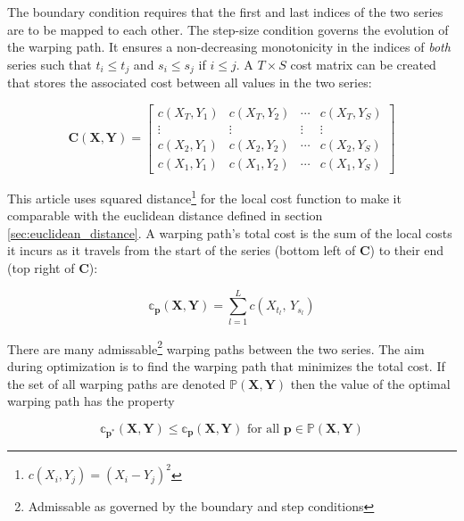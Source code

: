 \documentclass[12pt]{article}
\begin{document}
The boundary condition requires that the first and last indices of the two series are to be mapped to each other. The step-size condition governs the evolution of the warping path. It ensures a non-decreasing monotonicity in the indices of \emph{both} series such that $t_{i} \le t_{j}$ and $s_{i} \le s_{j}$ if $i \le j$. A $T \times S$ cost matrix can be created that stores the associated cost between all values in the two series:

\begin{equation}
    \mathbf{C}(\boldsymbol{X}, \boldsymbol{Y}) = \left[ 
        \begin{array}{cccc}
            c(X_{T}, Y_{1}) & c(X_{T}, Y_{2}) & \cdots & c(X_{T}, Y_{S}) \\ 
            \vdots          & \vdots          & \vdots & \vdots          \\
            c(X_{2}, Y_{1}) & c(X_{2}, Y_{2}) & \cdots & c(X_{2}, Y_{S}) \\ 
            c(X_{1}, Y_{1}) & c(X_{1}, Y_{2}) & \cdots & c(X_{1}, Y_{S})
    \end{array}\right]
\end{equation}

This article uses squared distance\footnote{$c(X_{i}, Y_{j}) = (X_{i} - Y_{j})^2$} for the local cost function to make it comparable with the euclidean distance defined in section \ref{sec:euclidean_distance}. A warping path's total cost is the sum of the local costs it incurs as it travels from the start of the series (bottom left of $\boldsymbol{C}$) to their end (top right of $\boldsymbol{C}$):

\begin{equation} \label{eq:dtw_cost_matrix_definition}
    \mathbb{c}_{\boldsymbol{p}}(\boldsymbol{X}, \boldsymbol{Y}) = \sum^{L}_{l=1} c(X_{t_{l}},\, Y_{s_{l}})
\end{equation}

There are many admissable\footnote{Admissable as governed by the boundary and step conditions} warping paths between the two series. The aim during optimization is to find the warping path that minimizes the total cost. If the set of all warping paths are denoted $\mathbb{P}(\boldsymbol{X}, \boldsymbol{Y})$ then the value of the optimal warping path has the property

\begin{equation}
    \mathbb{c}_{\boldsymbol{p}^{*}}(\boldsymbol{X}, \boldsymbol{Y}) \le \mathbb{c}_{\boldsymbol{p}}(\boldsymbol{X}, \boldsymbol{Y}) \,\, \textrm{for all} \,\, \boldsymbol{p} \in \mathbb{P}(\boldsymbol{X}, \boldsymbol{Y})
\end{equation}
\end{document}
